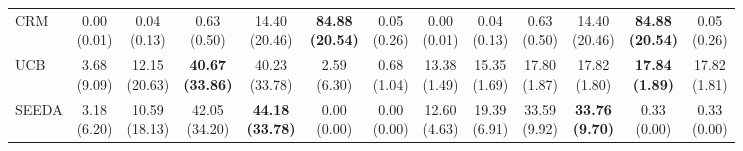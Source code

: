 {\begin{tabular}{l|cccccc|cccccc}
CRM & \makecell{0.00 \\ (0.01)} & \makecell{0.04 \\ (0.13)} & {\cellcolor[HTML]{C8E6C9}} \makecell{0.63 \\ (0.50)} & \makecell{14.40 \\ (20.46)} & \bfseries \makecell{84.88 \\ (20.54)} & \makecell{0.05 \\ (0.26)} & \makecell{0.00 \\ (0.01)} & \makecell{0.04 \\ (0.13)} & {\cellcolor[HTML]{C8E6C9}} \makecell{0.63 \\ (0.50)} & \makecell{14.40 \\ (20.46)} & \bfseries \makecell{84.88 \\ (20.54)} & \makecell{0.05 \\ (0.26)} \\
UCB & \makecell{3.68 \\ (9.09)} & \makecell{12.15 \\ (20.63)} & {\cellcolor[HTML]{C8E6C9}} \bfseries \makecell{40.67 \\ (33.86)} & \makecell{40.23 \\ (33.78)} & \makecell{2.59 \\ (6.30)} & \makecell{0.68 \\ (1.04)} & \makecell{13.38 \\ (1.49)} & \makecell{15.35 \\ (1.69)} & {\cellcolor[HTML]{C8E6C9}} \makecell{17.80 \\ (1.87)} & \makecell{17.82 \\ (1.80)} & \bfseries \makecell{17.84 \\ (1.89)} & \makecell{17.82 \\ (1.81)} \\
SEEDA & \makecell{3.18 \\ (6.20)} & \makecell{10.59 \\ (18.13)} & {\cellcolor[HTML]{C8E6C9}} \makecell{42.05 \\ (34.20)} & \bfseries \makecell{44.18 \\ (33.78)} & \makecell{0.00 \\ (0.00)} & \makecell{0.00 \\ (0.00)} & \makecell{12.60 \\ (4.63)} & \makecell{19.39 \\ (6.91)} & {\cellcolor[HTML]{C8E6C9}} \makecell{33.59 \\ (9.92)} & \bfseries \makecell{33.76 \\ (9.70)} & \makecell{0.33 \\ (0.00)} & \makecell{0.33 \\ (0.00)} \\

\end{tabular}}
